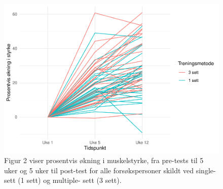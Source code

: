 \documentclass[
]{book}
\begin{document}
\begin{figure}
\centering
\includegraphics{_main_files/figure-latex/styrkefigur-1.pdf}
\caption{\label{fig:styrkefigur}Figur 2 viser prosentvis økning i muskelstyrke, fra pre-tests til 5 uker og 5 uker til post-test for alle forsøkspersoner skildt ved single- sett (1 sett) og multiple- sett (3 sett).}
\end{figure}

\providecommand{\docline}[3]{\noalign{\global\setlength{\arrayrulewidth}{#1}}\arrayrulecolor[HTML]{#2}\cline{#3}}

\setlength{\tabcolsep}{2pt}

\renewcommand*{\arraystretch}{1.5}
\end{document}
